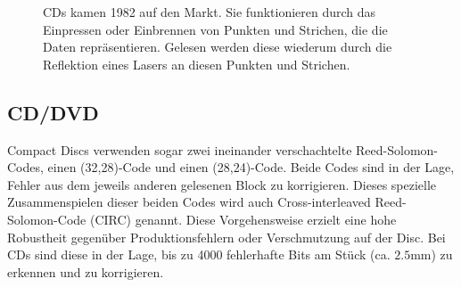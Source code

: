 \begin{figure}
	\centering
	\caption{CDs kamen 1982 auf den Markt. Sie funktionieren durch das Einpressen oder Einbrennen von Punkten und Strichen, die die Daten repräsentieren. Gelesen werden diese wiederum durch die Reflektion eines Lasers an diesen Punkten und Strichen.}
	\label{fig:cd}
\end{figure}
% 
%
%
%
%
%
%
%


\subsection{CD/DVD}
Compact Discs verwenden sogar zwei ineinander verschachtelte Reed-Solomon-Codes, einen (32,28)-Code und einen (28,24)-Code.
Beide Codes sind in der Lage, Fehler aus dem jeweils anderen gelesenen Block zu korrigieren. Dieses spezielle Zusammenspielen dieser beiden Codes wird auch Cross-interleaved Reed-Solomon-Code (CIRC) genannt.
%
%
Diese Vorgehensweise erzielt eine hohe Robustheit gegenüber Produktionsfehlern oder Verschmutzung auf der Disc. Bei CDs sind diese in der Lage, bis zu 4000 fehlerhafte Bits am Stück (ca. $2.5$mm) zu erkennen und zu korrigieren. 

